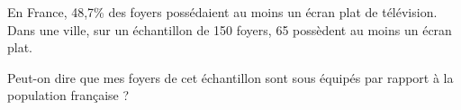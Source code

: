 
En France, 48,7\% des foyers possédaient au moins un écran plat de télévision.
Dans une ville, sur un échantillon de 150 foyers, 65 possèdent au moins un écran plat.

Peut-on dire que mes foyers de cet échantillon sont sous équipés par rapport à la population française ?
